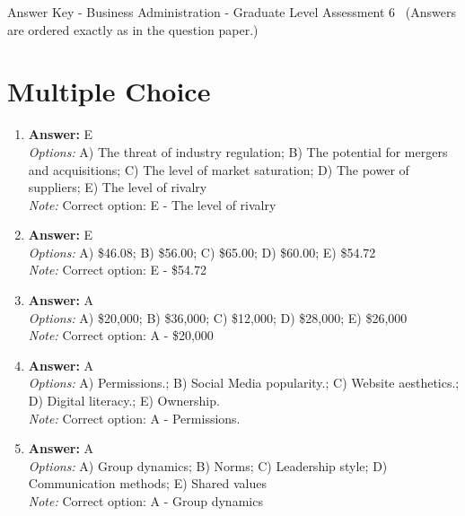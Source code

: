 \documentclass[12pt]{article}
\begin{document}
\begin{center}
Answer Key - Business Administration - Graduate Level Assessment 6 \
\small (Answers are ordered exactly as in the question paper.)
\end{center}

\section*{Multiple Choice}
\begin{enumerate}[label=\arabic*.]
\item \textbf{Answer:} E
\\ \textit{Options:} A) The threat of industry regulation; B) The potential for mergers and acquisitions; C) The level of market saturation; D) The power of suppliers; E) The level of rivalry
\\ \textit{Note:} Correct option: E - The level of rivalry
\item \textbf{Answer:} E
\\ \textit{Options:} A) \$46.08; B) \$56.00; C) \$65.00; D) \$60.00; E) \$54.72
\\ \textit{Note:} Correct option: E - \$54.72
\item \textbf{Answer:} A
\\ \textit{Options:} A) \$20,000; B) \$36,000; C) \$12,000; D) \$28,000; E) \$26,000
\\ \textit{Note:} Correct option: A - \$20,000
\item \textbf{Answer:} A
\\ \textit{Options:} A) Permissions.; B) Social Media popularity.; C) Website aesthetics.; D) Digital literacy.; E) Ownership.
\\ \textit{Note:} Correct option: A - Permissions.
\item \textbf{Answer:} A
\\ \textit{Options:} A) Group dynamics; B) Norms; C) Leadership style; D) Communication methods; E) Shared values
\\ \textit{Note:} Correct option: A - Group dynamics
\end{enumerate}
\end{document}
